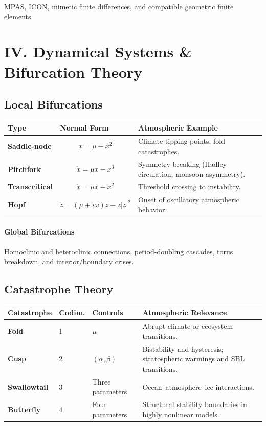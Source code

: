 \documentclass[11pt]{article}
\begin{document}
MPAS, ICON, mimetic finite differences, and compatible geometric finite
elements.

\section*{IV. Dynamical Systems \& Bifurcation Theory}

\subsection*{Local Bifurcations}

\begin{longtable}{>{\bfseries}p{}p{}p{}}
Type & Normal Form & Atmospheric Example\\
\midrule

Saddle-node &
\[
\dot x=\mu-x^2
\]
&
Climate tipping points; fold catastrophes.\\

Pitchfork &
\[
\dot x=\mu x-x^3
\]
&
Symmetry breaking (Hadley circulation, monsoon asymmetry).\\

Transcritical &
\[
\dot x=\mu x-x^2
\]
&
Threshold crossing to instability.\\

Hopf &
\[
\dot z=(\mu+i\omega)z-z|z|^2
\]
&
Onset of oscillatory atmospheric behavior.
\end{longtable}

\paragraph{Global Bifurcations}

Homoclinic and heteroclinic connections, period-doubling cascades,
torus breakdown, and interior/boundary crises.

\subsection*{Catastrophe Theory}

\begin{longtable}{>{\bfseries}p{}p{}p{}p{}}
Catastrophe & Codim. & Controls & Atmospheric Relevance\\
\midrule

Fold & 1 & $\mu$ &
Abrupt climate or ecosystem transitions.\\

Cusp & 2 &
$(\alpha,\beta)$ &
Bistability and hysteresis; stratospheric warmings and SBL transitions.\\

Swallowtail & 3 &
Three parameters &
Ocean--atmosphere--ice interactions.\\

Butterfly & 4 &
Four parameters &
Structural stability boundaries in highly nonlinear models.
\end{longtable}
\end{document}
